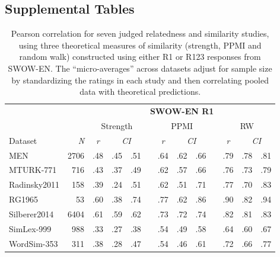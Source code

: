 \documentclass[a4paper,doc,natbib,floatsintext]{apa6}
\begin{document}
\newpage
\begin{appendix}
\section{Supplemental Tables}

\begin{table}
\begin{center}
\begin{small}
\caption{{\small Pearson correlation for seven judged relatedness and similarity studies, using three theoretical measures of similarity (strength, PPMI and random walk) constructed using either R1 or R123 responses from SWOW-EN. The ``micro-averages'' across datasets adjust for sample size by standardizing the ratings in each study and then correlating pooled data with theoretical predictions.}}
\label{Table:simDetailed_SWOW}
\begin{tabular}{@{}lrccclccccccc@{}}
\toprule
 & \multicolumn{1}{l}{} & \multicolumn{11}{c}{\textbf{SWOW-EN R1}} \\ \cmidrule(l){3-13}
 & \multicolumn{1}{l}{} & \multicolumn{3}{c}{Strength} &  & \multicolumn{3}{c}{PPMI} & \multicolumn{1}{l}{} & \multicolumn{3}{c}{RW} \\ \cmidrule(lr){3-5} \cmidrule(lr){7-9} \cmidrule(l){11-13}
Dataset & \textit{N} & \textit{r} & \multicolumn{2}{c}{\textit{CI}} & \multicolumn{1}{c}{\textit{}} & \textit{r} & \multicolumn{2}{c}{\textit{CI}} & \textit{} & \textit{r} & \multicolumn{2}{c}{\textit{CI}} \\ \cmidrule(lr){3-5} \cmidrule(lr){7-9} \cmidrule(l){11-13}
MEN	 			& 2706	 & .48	 & .45	 & .51	 & \multicolumn{1}{c}{} 	& .64	 & .62	 & .66	 & 	 & .79	 & .78	 & .81 \\
MTURK-771	 	& 716	 & .43	 & .37	 & .49	 & \multicolumn{1}{c}{}	 	& .62	 & .57	 & .66	 & 	 & .76	 & .73	 & .79 \\
Radinsky2011	& 158	 & .39	 & .24	 & .51	 & \multicolumn{1}{c}{} 	& .62	 & .51	 & .71	 & 	 & .77	 & .70	 & .83 \\
RG1965	 		& 53	 & .60	 & .38	 & .74	 & \multicolumn{1}{c}{} 	& .77	 & .62	 & .86	 & 	 & .90	 & .82	 & .94 \\
Silberer2014	& 6404	 & .61	 & .59	 & .62	 & \multicolumn{1}{c}{}	 	& .73	 & .72	 & .74	 & 	 & .82	 & .81	 & .83 \\
SimLex-999	 	& 988	 & .33	 & .27	 & .38	 & \multicolumn{1}{c}{}	 	& .54	 & .49	 & .58	 & 	 & .64	 & .60	 & .67 \\
WordSim-353		& 311	 & .38	 & .28	 & .47	 & \multicolumn{1}{c}{} 	& .54	 & .46	 & .61	 & 	 & .72	 & .66	 & .77 \\

\end{tabular}
\end{small}
\end{center}
\end{table}
\end{appendix}
\end{document}
